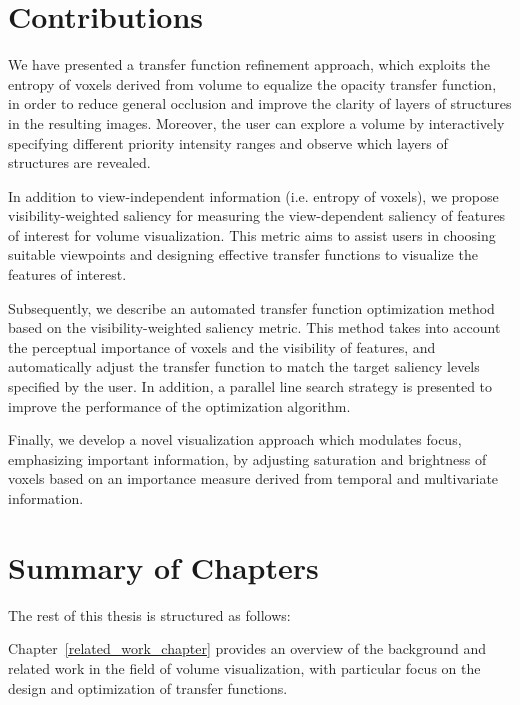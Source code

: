 
\section{Contributions}
We have presented a transfer function refinement approach, which exploits the entropy of voxels derived from volume to equalize the opacity transfer function, in order to reduce general occlusion and improve the clarity of layers of structures in the resulting images. Moreover, the user can explore a volume by interactively specifying different priority intensity ranges and observe which layers of structures are revealed.

In addition to view-independent information (i.e. entropy of voxels), we propose visibility-weighted saliency for measuring the view-dependent saliency of features of interest for volume visualization.
This metric aims to assist users in choosing suitable viewpoints and designing effective transfer functions to visualize the features of interest.

Subsequently, we describe an automated transfer function optimization method based on the visibility-weighted saliency metric. This method takes into account the perceptual importance of voxels and the visibility of features, and automatically adjust the transfer function to match the target saliency levels specified by the user. In addition, a parallel line search strategy is presented to improve the performance of the optimization algorithm.

Finally, we develop a novel visualization approach which modulates focus, emphasizing important information, by adjusting saturation and brightness of voxels based on an importance measure derived from temporal and multivariate information.

\section{Summary of Chapters}
The rest of this thesis is structured as follows:

Chapter~\ref{related_work_chapter}
provides an overview of the background and related work in the field of volume visualization, with particular focus on the design and optimization of transfer functions.

